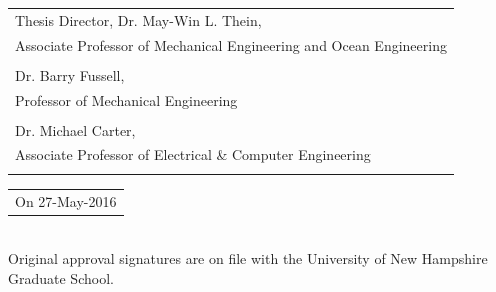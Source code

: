 \documentclass[12pt,a4paper]{book}
\begin{document}
\begin{supertabular}{p{12cm}}
         {Thesis Director, Dr. May-Win L. Thein},\\
         \small{Associate Professor of Mechanical Engineering and Ocean Engineering} \\
         \vspace{2.5mm} \\
         {Dr. Barry Fussell},\\
         \small{Professor of Mechanical Engineering}
         \\
         \vspace{2.5mm}\\
         {Dr. Michael Carter},\\
         \small{Associate Professor of Electrical \& Computer Engineering} \\
         \vspace{6mm}\\
    \end{supertabular}

 \hspace*{6cm}   \begin{tabular*}{2in}{l}
        On 27-May-2016
        \vspace{6mm}

    \end{tabular*}
        \\
        Original approval signatures are on file with the University of New Hampshire Graduate School.
\end{document}
